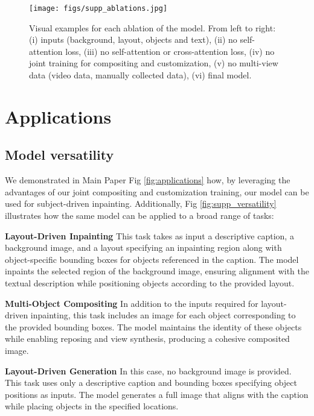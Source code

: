 \begin{figure*}[t]
    \centering
    \texttt{[image: figs/supp\_ablations.jpg]}
    \caption{Visual examples for each ablation of the model. From left to right: (i) inputs (background, layout, objects and text), (ii) no self-attention loss, (iii) no self-attention or cross-attention loss, (iv) no joint training for compositing and customization, (v) no multi-view data (\ie video data, manually collected data), (vi) final model.}

    \label{fig:supp_ablation}
\end{figure*}


\section{Applications}
\subsection{Model versatility}

We demonstrated in Main Paper Fig \ref{fig:applications} how, by leveraging the advantages of our joint compositing and customization training, our model can be used for subject-driven inpainting. Additionally, Fig \ref{fig:supp_versatility} illustrates how the same model can be applied to a broad range of tasks: 

\textbf{Layout-Driven Inpainting} This task takes as input a descriptive caption, a background image, and a layout specifying an inpainting region along with object-specific bounding boxes for objects referenced in the caption. The model inpaints the selected region of the background image, ensuring alignment with the textual description while positioning objects according to the provided layout.

\textbf{Multi-Object Compositing} In addition to the inputs required for layout-driven inpainting, this task includes an image for each object corresponding to the provided bounding boxes. The model maintains the identity of these objects while enabling reposing and view synthesis, producing a cohesive composited image. %

\textbf{Layout-Driven Generation} In this case, no background image is provided. This task uses only a descriptive caption and bounding boxes specifying object positions as inputs. The model generates a full image that aligns with the caption while placing objects in the specified locations. %

